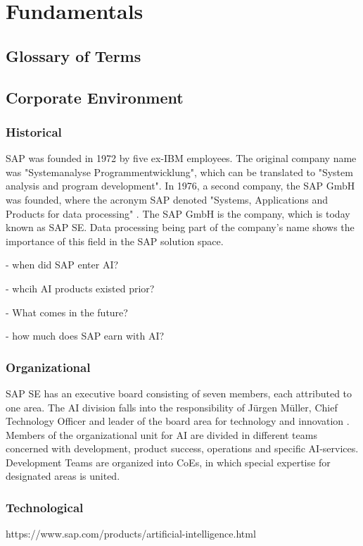 \chapter{Fundamentals}
\section{Glossary of Terms}

\section{Corporate Environment}

	\subsection{Historical}
	SAP was founded in 1972 by five ex-IBM employees. The original company name was "Systemanalyse Programmentwicklung", which can be translated to "System analysis and program development". In 1976, a second company, the SAP GmbH was founded, where the acronym SAP denoted "Systems, Applications and Products for data processing" \cite{GeschichteSAP1972}. The SAP GmbH is the company, which is today known as SAP SE. 
	Data processing being part of the company's name shows the importance of this field in the SAP solution space. 

	- when did SAP enter AI?
	
	- whcih AI products existed prior?
	
	- What comes in the future?
	
	- how much does SAP earn with AI?
	
	\subsection{Organizational}
	SAP SE has an executive board consisting of seven members, each attributed to one area. The \ac{AI} division falls into the responsibility of Jürgen Müller, Chief Technology Officer and leader of the board area for technology and innovation \cite{JuergenMuellerBiography}.
	Members of the organizational unit for \ac{AI} are divided in different teams concerned with development, product success, operations and specific \ac{AI}-services. Development Teams are organized into \acp{CoE}, in which special expertise for designated areas is united.
	
	\subsection{Technological}
	https://www.sap.com/products/artificial-intelligence.html
	
